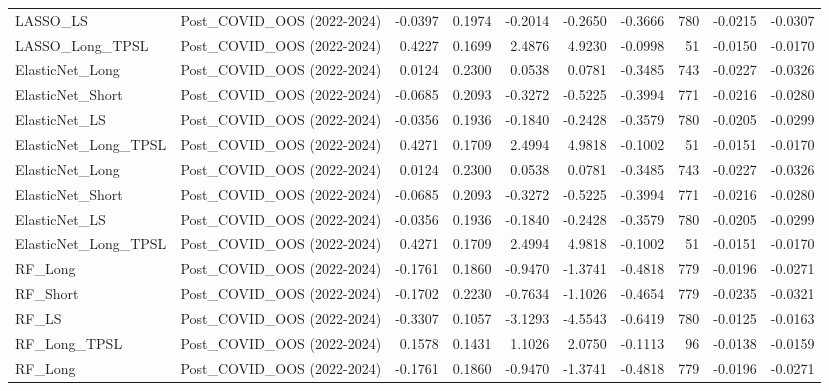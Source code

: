 \begin{tabular}{llrrrrrrrr}
LASSO\_LS & Post\_COVID\_OOS (2022-2024) & -0.0397 & 0.1974 & -0.2014 & -0.2650 & -0.3666 & 780 & -0.0215 & -0.0307 \\
\cline{1-10}
LASSO\_Long\_TPSL & Post\_COVID\_OOS (2022-2024) & 0.4227 & 0.1699 & 2.4876 & 4.9230 & -0.0998 & 51 & -0.0150 & -0.0170 \\
\cline{1-10}
ElasticNet\_Long & Post\_COVID\_OOS (2022-2024) & 0.0124 & 0.2300 & 0.0538 & 0.0781 & -0.3485 & 743 & -0.0227 & -0.0326 \\
\cline{1-10}
ElasticNet\_Short & Post\_COVID\_OOS (2022-2024) & -0.0685 & 0.2093 & -0.3272 & -0.5225 & -0.3994 & 771 & -0.0216 & -0.0280 \\
\cline{1-10}
ElasticNet\_LS & Post\_COVID\_OOS (2022-2024) & -0.0356 & 0.1936 & -0.1840 & -0.2428 & -0.3579 & 780 & -0.0205 & -0.0299 \\
\cline{1-10}
ElasticNet\_Long\_TPSL & Post\_COVID\_OOS (2022-2024) & 0.4271 & 0.1709 & 2.4994 & 4.9818 & -0.1002 & 51 & -0.0151 & -0.0170 \\
\cline{1-10}
ElasticNet\_Long & Post\_COVID\_OOS (2022-2024) & 0.0124 & 0.2300 & 0.0538 & 0.0781 & -0.3485 & 743 & -0.0227 & -0.0326 \\
\cline{1-10}
ElasticNet\_Short & Post\_COVID\_OOS (2022-2024) & -0.0685 & 0.2093 & -0.3272 & -0.5225 & -0.3994 & 771 & -0.0216 & -0.0280 \\
\cline{1-10}
ElasticNet\_LS & Post\_COVID\_OOS (2022-2024) & -0.0356 & 0.1936 & -0.1840 & -0.2428 & -0.3579 & 780 & -0.0205 & -0.0299 \\
\cline{1-10}
ElasticNet\_Long\_TPSL & Post\_COVID\_OOS (2022-2024) & 0.4271 & 0.1709 & 2.4994 & 4.9818 & -0.1002 & 51 & -0.0151 & -0.0170 \\
\cline{1-10}
RF\_Long & Post\_COVID\_OOS (2022-2024) & -0.1761 & 0.1860 & -0.9470 & -1.3741 & -0.4818 & 779 & -0.0196 & -0.0271 \\
\cline{1-10}
RF\_Short & Post\_COVID\_OOS (2022-2024) & -0.1702 & 0.2230 & -0.7634 & -1.1026 & -0.4654 & 779 & -0.0235 & -0.0321 \\
\cline{1-10}
RF\_LS & Post\_COVID\_OOS (2022-2024) & -0.3307 & 0.1057 & -3.1293 & -4.5543 & -0.6419 & 780 & -0.0125 & -0.0163 \\
\cline{1-10}
RF\_Long\_TPSL & Post\_COVID\_OOS (2022-2024) & 0.1578 & 0.1431 & 1.1026 & 2.0750 & -0.1113 & 96 & -0.0138 & -0.0159 \\
\cline{1-10}
RF\_Long & Post\_COVID\_OOS (2022-2024) & -0.1761 & 0.1860 & -0.9470 & -1.3741 & -0.4818 & 779 & -0.0196 & -0.0271 \\

\end{tabular}
